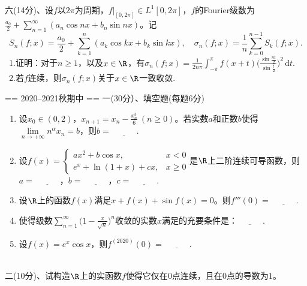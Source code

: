 ~\\
六(14分)、设$f$以$2\pi$为周期，$f|_{[0,2\pi]}\in L^1[0,2\pi]$，$f$的Fourier级数为$\displaystyle \frac{a_0}{2}+\sum_{n=1}^\infty(a_n\cos nx+b_n\sin nx)$。记
$$S_n(f;x)=\frac{a_0}{2}+\sum_{k=1}^n(a_k\cos kx+b_k\sin kx),\quad \sigma_n(f;x)=\frac{1}{n}\sum_{k=0}^{n-1}S_k(f;x).$$
\quad\ 1.证明：对于$n\ge1$，以及$x\in\R$，有$\displaystyle \sigma_n(f;x)=\frac{1}{2n\pi}\int_{-\pi}^\pi f(x+t)\bigg(\frac{\sin\frac{nt}{2}}{\sin\frac{t}{2}}\bigg)^2 \,\mathrm{d}t.$\\
\quad\ 2.若$f$连续，则$\sigma_n(f;x)$关于$x\in\R$一致收敛.


== 2020--2021秋期中 ==
一(30分）、填空题(每题6分)
\begin{enumerate}[label=(\arabic*)]
\item 设$x_0\in(0,2)$，$\displaystyle x_{n+1}=x_n-\frac{x_n^3}{6}\ (n\ge0)$。若实数$a$和正数$b$使得$\lim\limits_{n\to+\infty}n^\alpha x_n=b$，则$b=\underline{\qquad\quad}$.
\item 设$f(x)=\begin{cases}ax^2+b\cos x,&x<0\\e^x+\ln(1+x)+cx,&x\ge0\end{cases}$是$\R$上二阶连续可导函数，则$a=\underline{\qquad\quad}$，$b=\underline{\qquad\quad}$，$c=\underline{\qquad\quad}$.
\item 设$\R$上的函数$f(x)$满足$x+f(x)+\sin f(x)=0$。则$f'''(0)=\underline{\qquad\quad}$.
\item 使得级数$\displaystyle \sum\limits_{n=1}^{\infty} \Big(1-\frac{x}{\sqrt{n}}\Big)^n$收敛的实数$x$满足的充要条件是：$\underline{\qquad\quad}$.
\item 设$f(x)=e^x\cos x$，则$f^{(2020)}(0)=\underline{\qquad\quad}$.
\end{enumerate}
~\\
二(10分)、试构造$\R$上的实函数$f$使得它仅在$0$点连续，且在$0$点的导数为$1$。


